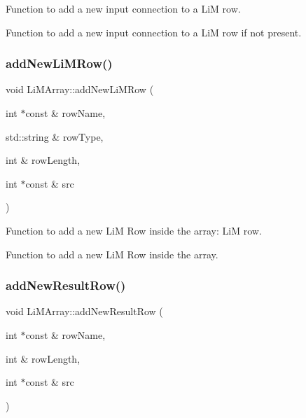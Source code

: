 Function to add a new input connection to a LiM row. 

Function to add a new input connection to a LiM row if not present. \mbox{\label{classoctantis_1_1LiMArray_a3c9c115f7ea64d10b10bb8be669e98ad}} 
\subsubsection{\texorpdfstring{add\+New\+Li\+M\+Row()}{addNewLiMRow()}}
{\footnotesize\ttfamily void Li\+M\+Array\+::add\+New\+Li\+M\+Row (\begin{DoxyParamCaption}\item[{int $\ast$const \&}]{row\+Name,  }\item[{std\+::string \&}]{row\+Type,  }\item[{int \&}]{row\+Length,  }\item[{int $\ast$const \&}]{src }\end{DoxyParamCaption})}



Function to add a new LiM Row inside the array\+: LiM row. 

Function to add a new LiM Row inside the array. \mbox{\label{classoctantis_1_1LiMArray_a37a3335b4bdddc1e7c8fc5a2de5ec226}} 
\subsubsection{\texorpdfstring{add\+New\+Result\+Row()}{addNewResultRow()}}
{\footnotesize\ttfamily void Li\+M\+Array\+::add\+New\+Result\+Row (\begin{DoxyParamCaption}\item[{int $\ast$const \&}]{row\+Name,  }\item[{int \&}]{row\+Length,  }\item[{int $\ast$const \&}]{src }\end{DoxyParamCaption})}




